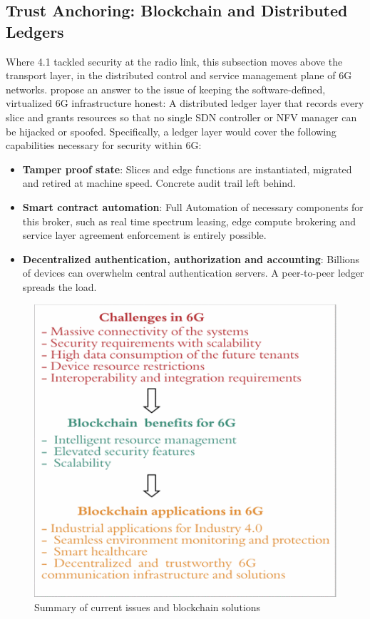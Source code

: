 \documentclass[acmtog]{acmart}
\begin{document}
\subsection{Trust Anchoring: Blockchain and Distributed Ledgers}
Where 4.1 tackled security at the radio link, this subsection moves above the transport layer, in the distributed control and service management plane of 6G networks. \cite{ref2} propose an answer to the issue of keeping the software-defined, virtualized 6G infrastructure honest: A distributed ledger layer that records every slice and grants resources so that no single SDN controller or NFV manager can be hijacked or spoofed. Specifically, a ledger layer would cover the following capabilities necessary for security within 6G:
\begin{itemize}
  \item \textbf{Tamper proof state}: Slices and edge functions are instantiated, migrated and retired at machine speed. Concrete audit trail left behind.
  \item \textbf{Smart contract automation}:  Full Automation of necessary components for this broker, such as real time spectrum leasing, edge compute brokering and service layer agreement enforcement is entirely possible.
  \item \textbf{Decentralized authentication, authorization and accounting}: Billions of devices can overwhelm central authentication servers. A peer-to-peer ledger spreads the load.
\end{itemize}
\begin{figure}[h]
  \centering
  \includegraphics[width=0.8\linewidth,keepaspectratio]{true_ref2_summary.png}
  \caption{Summary of current issues and blockchain solutions \cite{ref2}}
\end{figure}
\end{document}
